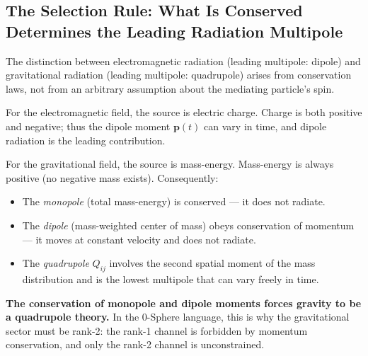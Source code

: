 \documentclass[%
 reprint, amsmath,amssymb, aps, prd, ]{revtex4-2}
\numberwithin{equation}{section}
\begin{document}
\subsection{The Selection Rule: What Is Conserved Determines the Leading Radiation Multipole}

The distinction between electromagnetic radiation (leading multipole: dipole) and gravitational radiation (leading multipole: quadrupole) arises from conservation laws, not from an arbitrary assumption about the mediating particle's spin.

For the electromagnetic field, the source is electric charge.
Charge is both positive and negative; thus the dipole moment $\mathbf{p}(t)$ can vary in time, and dipole radiation is the leading contribution.

For the gravitational field, the source is mass-energy.
Mass-energy is always positive (no negative mass exists).
Consequently:
\begin{itemize}[leftmargin=2em, itemsep=2pt]
\item The \emph{monopole} (total mass-energy) is conserved --- it does not radiate.
\item The \emph{dipole} (mass-weighted center of mass) obeys conservation of momentum --- it moves at constant velocity and does not radiate.
\item The \emph{quadrupole} $Q_{ij}$ involves the second spatial moment of the mass distribution and is the lowest multipole that can vary freely in time.
\end{itemize}
\textbf{The conservation of monopole and dipole moments forces gravity to be a quadrupole theory.}
In the 0-Sphere language, this is why the gravitational sector must be rank-2: the rank-1 channel is forbidden by momentum conservation, and only the rank-2 channel is unconstrained.
\end{document}
